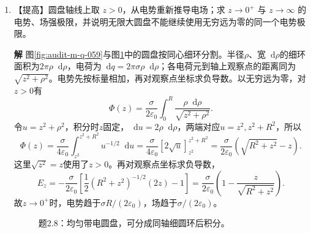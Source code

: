 \documentclass[11pt,openany,fontset=fandol]{ctexbook}
\theoremstyle{plain}\newtheorem{theorem}{定理}[chapter]\newtheorem{proposition}[theorem]{命题}
\theoremstyle{definition}\newtheorem{definition}{定义}[chapter]\newtheorem{example}{例}[chapter]
\theoremstyle{remark}\newtheorem*{remark}{说明}
\newcommand{\SolutionStart}{\par\nobreak\medskip\nobreak\noindent\textbf{解}\quad\ignorespaces}
\newenvironment{solution}{\SolutionStart}{\par\medskip}
\newcommand{\dd}{\mathop{}\!\mathrm d}\newcommand{\ii}{\mathrm i}\newcommand{\ee}{\mathrm e}
\begin{document}
\begin{enumerate}[label=2.\arabic*]
\begin{solution}
代回极值点，几何因子为
\[\frac{R/\sqrt2}{(R^2+R^2/2)^{3/2}}
=\frac{R}{\sqrt2}\frac{2^{3/2}}{3^{3/2}R^3}
=\frac2{3\sqrt3R^2}.\]
故$E_{\max}=[Q/(4\pi\varepsilon_0)]\,2/(3\sqrt3R^2)$，具有场强的量纲。

求得的最大位置 $z=R/\sqrt2$ 比环半径小；环面处为零、远处也趋零，结合导数符号便能判定全局最大。
\end{solution}

\item \begin{minipage}[t]{\linewidth}
【提高】圆盘轴线上取 $z>0$，从电势重新推导电场；求 $z\to0^+$ 与 $z\to\infty$ 的电势、场强极限，并说明无限大圆盘不能继续使用无穷远为零的同一个电势极限。

\end{minipage}

\begin{solution}
图\ref{fig:audit-m-q-059}与图\ref{fig:ex-2-8}中的圆盘按同心细环分割。半径$\rho$、宽$\dd\rho$的细环面积为$2\pi\rho\dd\rho$，电荷为$\dd q=2\pi\sigma\rho\dd\rho$；各电荷元到轴上观察点的距离同为$\sqrt{z^2+\rho^2}$。电势先按标量相加，再对观察点坐标求负导数。以无穷远为零，对$z>0$有
\[
\Phi(z)=\frac{\sigma}{2\varepsilon_0}\int_0^R\frac{\rho\dd\rho}{\sqrt{z^2+\rho^2}}.
\]
令$u=z^2+\rho^2$，积分时$z$固定，$\dd u=2\rho\dd\rho$，两端对应$u=z^2,z^2+R^2$，所以
\[\Phi(z)=\frac{\sigma}{4\varepsilon_0}
\int_{z^2}^{z^2+R^2}u^{-1/2}\dd u
=\frac{\sigma}{4\varepsilon_0}[2\sqrt u]_{z^2}^{z^2+R^2}
=\frac{\sigma}{2\varepsilon_0}(\sqrt{R^2+z^2}-z).\]
这里$\sqrt{z^2}=z$使用了$z>0$。再对观察点坐标求负导数，
\[E_z=-\frac{\sigma}{2\varepsilon_0}
\left[\frac12(R^2+z^2)^{-1/2}(2z)-1\right]
=\frac{\sigma}{2\varepsilon_0}\left(1-\frac z{\sqrt{R^2+z^2}}\right).\]
故$z\to0^+$时，电势趋于$\sigma R/(2\varepsilon_0)$，场趋于$\sigma/(2\varepsilon_0)$。

\begin{figure}[H]\centering
{}
\caption{题2.8：均匀带电圆盘，可分成同轴细圆环后积分。}\label{fig:ex-2-8}
\end{figure}


\end{solution}
\end{enumerate}
\end{document}

